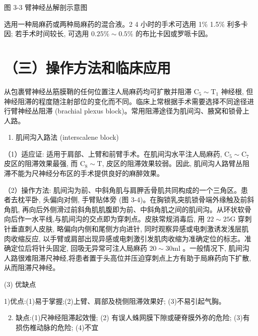 \documentclass[10pt]{article}
\begin{document}
图 3-3 臂神经丛解剖示意图

选用一种局麻药或两种局麻药的混合液。2 4 小时的手术可选用 1\% 1.5\% 利多卡因; 若手术时间较长, 可选用 $0.25 \% \sim 0.5 \%$ 的布比卡因或罗哌卡因。

\section*{（三）操作方法和临床应用}
从包裹臂神经丛筋膜鞘的任何位置注人局麻药均可扩散并阻滞 $\mathrm{C}_{5} \sim \mathrm{T}_{1}$ 神经根, 但神经阻滞的程度随注射部位的变化而不同。临床上常根据手术需要选择不同途径进行臂神经丛阻滞 (brachial plexus block)。常用阻滞途径为肌间沟、腋窝和锁骨上人路。

\begin{enumerate}
  \item 肌间沟入路法 (interscalene block)
\end{enumerate}

（1）适应证: 适用于肩部、上臂和前臂手术。在肌间沟水平注人局麻药, $\mathrm{C}_{5} \sim \mathrm{C}_{7}$ 皮区的阻滞效果最强, 而 $\mathrm{C}_{8} \sim \mathrm{T}$, 皮区的阻滞效果较弱。因此, 肌间沟人路臂丛阻滞不能为尺神经分布区的手术提供良好的麻醉效果。

（2）操作方法: 肌间沟为前、中斜角肌与肩胛舌骨肌共同构成的一个三角区。患者去枕平卧, 头偏向对侧, 手臂贴体旁 (图 3-4)。在胸锁乳突肌锁骨端外缘触及前斜角肌, 再向后外侧滑过前斜角肌肌腹即为前、中斜角肌之间的肌间沟。从环状软骨向后作一水平线,与肌间沟的交点即为穿刺点。皮肤常规消毒后, 用 $22 \sim 25 \mathrm{G}$ 穿刺针垂直刺人皮肤, 略偏向内侧和尾侧方向进针, 同时观察异感或电刺激诱发浅层肌肉收缩反应, 以手臂或肩部出现异感或电刺激引发肌肉收缩为准确定位的标志。准确定位后将针头固定, 回吸无异常可注人局麻药 $20 \sim 30 \mathrm{ml}$ 。一般情况下, 肌间沟人路很难阻滞尺神经,将患者置于头高位并压迫穿刺点上方有助于局麻药向下扩散, 从而阻滞尺神经。

(3) 优缺点

1)优点:(1)易于掌握;(2)上臂、肩部及桡侧阻滞效果好; (3)不易引起气胸。

\begin{enumerate}
  \setcounter{enumi}{1}
  \item 缺点:(1)尺神经阻滞起效慢; (2) 有误人蛛网膜下隙或硬脊膜外弥的危险; (3)有损伤椎动脉的危险; (4)不宜
\end{enumerate}
\end{document}
